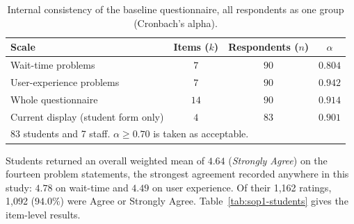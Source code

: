 \documentclass{research}
\begin{document}
\begin{table}[H]
\centering
\caption{Internal consistency of the baseline questionnaire, all
respondents as one group (Cronbach's alpha).}
\label{tab:sop1-reliability}
\begin{tabular}{lccc}
\hline
Scale & Items ($k$) & Respondents ($n$) & $\alpha$ \\
\hline
Wait-time problems & $7$ & $90$ & $0.804$ \\
User-experience problems & $7$ & $90$ & $0.942$ \\
Whole questionnaire & $14$ & $90$ & $0.914$ \\
Current display (student form only) & $4$ & $83$ & $0.901$ \\
\hline
\multicolumn{4}{l}{\footnotesize 83 students and 7 staff.
$\alpha \geq 0.70$ is taken as acceptable.} \\
\end{tabular}
\end{table}

\label{subsec:sop1-students}

Students returned an overall weighted mean of $4.64$ (\emph{Strongly
Agree}) on the fourteen problem statements, the strongest agreement
recorded anywhere in this study: $4.78$ on wait-time and $4.49$ on user
experience. Of their 1,162 ratings, 1,092 ($94.0\%$) were Agree or
Strongly Agree. Table~\ref{tab:sop1-students} gives the item-level
results.
\end{document}
